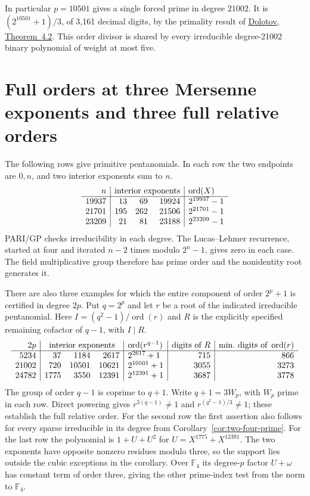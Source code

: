\documentclass[11pt]{article}
\begin{document}
In particular \(p=10501\) gives a single forced prime in degree
\(21002\). It is \((2^{10501}+1)/3\), of 3,161 decimal digits,
by the primality result of
\href{https://arxiv.org/html/2605.18555v1\#S4.SS3}{Dolotov,
Theorem~4.2}. This order divisor is shared by every irreducible
degree-21002 binary polynomial of weight at most five.


\section{Full orders at three Mersenne exponents and three full relative orders}
\label{sec:large-circle-orders}

The following rows give primitive pentanomials. In each row the two
endpoints are \(0,n\), and two interior exponents sum to \(n\).
\[
\begin{array}{r|r r r|l}
 n&\multicolumn{3}{c|}{\text{interior exponents}}&\operatorname{ord}(X)\\\hline
 19937&13&69&19924&2^{19937}-1\\
 21701&195&262&21506&2^{21701}-1\\
 23209&21&81&23188&2^{23209}-1
\end{array}
\]
PARI/GP checks irreducibility in each degree. The Lucas--Lehmer
recurrence, started at four and iterated \(n-2\) times modulo
\(2^n-1\), gives zero in each case. The field multiplicative group
therefore has prime order and the nonidentity root generates it.

There are also three examples for which the entire component of
order \(2^p+1\) is certified in degree \(2p\). Put \(q=2^p\) and
let \(r\) be a root of the indicated irreducible pentanomial. Here
\(I=(q^2-1)/\operatorname{ord}(r)\) and \(R\) is the explicitly
specified remaining cofactor of \(q-1\), with \(I\mid R\).
\[
\begin{array}{r|r r r|l|r|r}
2p&\multicolumn{3}{c|}{\text{interior exponents}}&
\operatorname{ord}(r^{q-1})&\text{digits of }R&
\text{min.\ digits of }\operatorname{ord}(r)\\\hline
5234&37&1184&2617&2^{2617}+1&715&866\\
21002&720&10501&10621&2^{10501}+1&3055&3273\\
24782&1775&3550&12391&2^{12391}+1&3687&3778
\end{array}
\]
The group of order \(q-1\) is coprime to \(q+1\). Write
\(q+1=3W_p\), with \(W_p\) prime in each row. Direct powering gives
\(r^{3(q-1)}\ne1\) and \(r^{(q^2-1)/3}\ne1\); these establish the
full relative order. For the second row the first assertion also
follows for every sparse irreducible in its degree from
Corollary~\ref{cor:two-four-prime}. For the last row the polynomial
is \(1+U+U^2\) for \(U=X^{1775}+X^{12391}\). The two exponents have
opposite nonzero residues modulo three, so the support lies outside
the cubic exceptions in the corollary. Over \(\mathbb F_4\) its
degree-\(p\) factor \(U+\omega\) has constant term of order three,
giving the other prime-index test from the norm to \(\mathbb F_4\).
\end{document}
